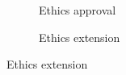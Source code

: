 \begin{figure}
\centering
\begin{subfigure}[t]{0.7\textwidth}
    \centering
    \caption{Ethics approval}
\end{subfigure}
\hfill
\begin{subfigure}[t]{0.7\textwidth}
\centering
{}
    \caption{Ethics extension}

\end{subfigure}
\end{figure}
